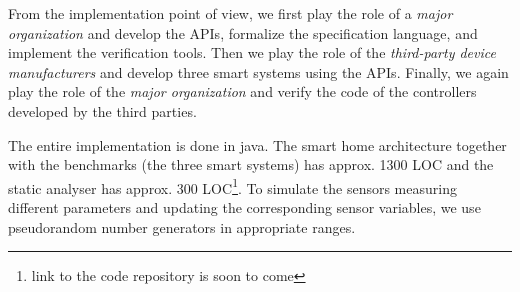 \documentclass{article}
\begin{document}
From the implementation point of view, we first play the role of a \textit{major organization} and develop the APIs, formalize the specification language, and implement the verification tools. Then we play the role of the \textit{third-party device manufacturers} and develop three smart systems using the APIs. Finally, we again play the role of the \textit{major organization} and verify  the code of the controllers developed by the third parties.

The entire implementation is done in java. The smart home architecture together with the benchmarks (the three smart systems) has approx. 1300 LOC and the static analyser has approx. 300 LOC\footnote{link to the code repository is soon to come}. To simulate the sensors measuring different parameters and updating the corresponding sensor variables, we use pseudorandom number generators in appropriate ranges. \\
\end{document}
